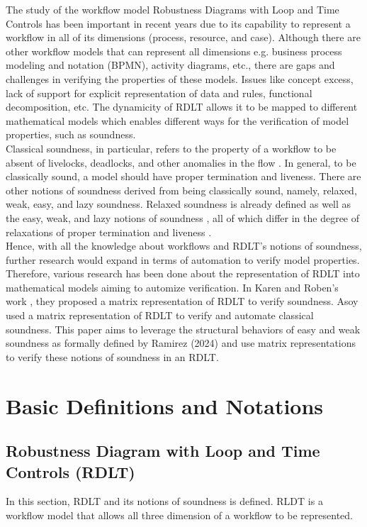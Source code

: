 \indent The study of the workflow model Robustness Diagrams with Loop and Time Controls has been important in recent years due to its capability to represent a workflow in all of its dimensions (process, resource, and case). Although there are other workflow models that can represent all dimensions e.g. business process modeling and notation (BPMN), activity diagrams, etc., there are gaps and challenges in verifying the properties of these models. Issues like concept excess, lack of support for explicit representation of data and rules, functional decomposition, etc. The dynamicity of RDLT allows it to be mapped to different mathematical models which enables different ways for the verification of model properties, such as soundness. \cite{Malinao2017} \\

\indent Classical soundness, in particular, refers to the property of a workflow to be absent of livelocks, deadlocks, and other anomalies in the flow \cite{Ramirez2024}. In general, to be classically sound, a model should have proper termination and liveness. There are other notions of soundness derived from being classically sound, namely, relaxed, weak, easy, and lazy soundness. Relaxed soundness \cite{MalinaoPJS2023} is already defined as well as the easy, weak, and lazy notions of soundness \cite{Ramirez2024}, all of which differ in the degree of relaxations of proper termination and liveness \cite{MalinaoPJS2023}.\\  

\indent Hence, with all the knowledge about workflows and RDLT's notions of soundness, further research would expand in terms of automation to verify model properties. Therefore, various research has been done about the representation of RDLT into mathematical models aiming to automize verification. In Karen and Roben's work \cite{KarenRoben2018}, they proposed a matrix representation of RDLT to verify soundness. Asoy \cite{MalinaoPJS2023} used a matrix representation of RDLT to verify and automate classical soundness. This paper aims to leverage the structural behaviors of easy and weak soundness as formally defined by Ramirez (2024) and use matrix representations to verify these notions of soundness in an RDLT.


\section{Basic Definitions and Notations}
\subsection*{Robustness Diagram with Loop and Time Controls (RDLT)}
In this section, RDLT and its notions of soundness is defined. 
\indent RLDT is a workflow model that allows all three dimension of a workflow to be represented.

